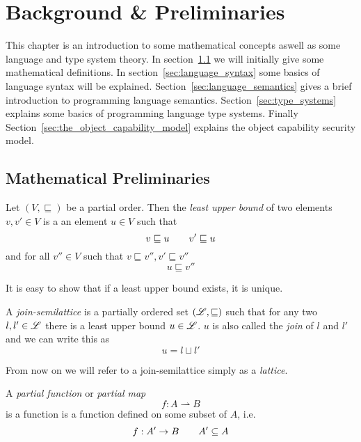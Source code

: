 \chapter{Background \& Preliminaries} \label{cha:background}

This chapter is an introduction to some mathematical concepts aswell as some
language and type system theory.  In section~\ref{sec:mathematical_definitions}
we will initially give some mathematical definitions. In
section~\ref{sec:language_syntax} some basics of language syntax will be
explained. Section~\ref{sec:language_semantics} gives a brief introduction to
programming language semantics. Section~\ref{sec:type_systems} explains
some basics of programming language type systems. Finally
Section~\ref{sec:the_object_capability_model} explains the object capability
security model.

\section{Mathematical Preliminaries}
\label{sec:mathematical_definitions}

\begin{definition}
  Let $(V, \sqsubseteq)$ be a partial order. Then the \emph{least upper bound}
  of two elements $v, v' \in V$ is a an element $u \in V$ such that
  \begin{equation*}
    v \sqsubseteq u \quad\quad v' \sqsubseteq u
  \end{equation*}
  and for all $v'' \in V$ such that $v \sqsubseteq v'', v' \sqsubseteq v''$
  \begin{equation*}
    u \sqsubseteq v''
  \end{equation*}
\end{definition}
It is easy to show that if a least upper bound exists, it is unique.
\begin{definition}
  A \emph{join-semilattice} is a partially ordered set $(\mbox{$\mathscr{L}$}, \sqsubseteq)$ such
  that for any two $l, l' \in \mbox{$\mathscr{L}$}$ there is a least upper bound $u \in
  \mbox{$\mathscr{L}$}$. $u$ is also called the \emph{join} of $l$ and $l'$ and we can write
  this as
  \begin{equation*}
    u = l \sqcup l'
  \end{equation*}
\end{definition}
From now on we will refer to a join-semilattice simply as a \emph{lattice}.
\begin{definition}
  A \emph{partial function} or \emph{partial map}
  \begin{equation*}
    f: A \rightharpoonup B
  \end{equation*}
  is a function is a function defined on some subset of $A$, i.e.
  \begin{equation*}
    f: A' \to B \quad\quad A' \subseteq A
  \end{equation*}
\end{definition}



